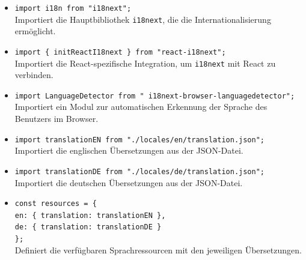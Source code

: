\begin{itemize}
	\item \texttt{import i18n from "\texttt{i18next}";} \\
	Importiert die Hauptbibliothek \texttt{i18next}, die die Internationalisierung ermöglicht.
	
	\item \texttt{import \{ initReactI18next \} from "react-i18next";} \\
	Importiert die React-spezifische Integration, um \texttt{i18next} mit React zu verbinden.
	
	\item \texttt{import LanguageDetector from " \texttt{i18next}-browser-languagedetector";} \\
	Importiert ein Modul zur automatischen Erkennung der Sprache des Benutzers im Browser.
	
	\item \texttt{import translationEN from "./locales/en/translation.json";} \\
	Importiert die englischen Übersetzungen aus der JSON-Datei.
	
	\item \texttt{import translationDE from "./locales/de/translation.json";} \\
	Importiert die deutschen Übersetzungen aus der JSON-Datei.
	
	\item \texttt{const resources = \{} \\
	\hspace{1em} \texttt{en: \{ translation: translationEN \},} \\
	\hspace{1em} \texttt{de: \{ translation: translationDE \}} \\
	\texttt{\};} \\
	Definiert die verfügbaren Sprachressourcen mit den jeweiligen Übersetzungen.
	

\end{itemize}
